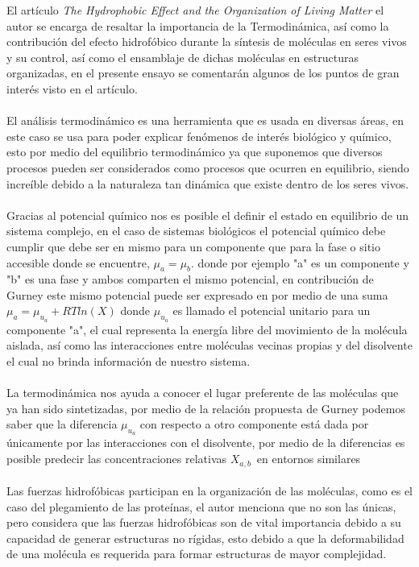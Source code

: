 \documentclass[10pt]{article}
\title{\bt{Termodinámica y el efecto hidrofóbico en la organización de los seres vivos}}
\author{Pérez Alvarado Luis Raymundo, Facultad de Química, UNAM}
\date{16 de octubre de 2020}
\newcommand{\np}[1]{\paragraph{\normalfont{#1}}}
\newcommand{\et}[1]{\emph{#1}}
\begin{document}
    \maketitle

    El artículo \et{The Hydrophobic Effect and the Organization of Living Matter} \cite{article:article} el autor se encarga de resaltar la importancia de la Termodinámica, así como la contribución del efecto hidrofóbico durante la síntesis de moléculas en seres vivos y su control, así como el ensamblaje de dichas moléculas en estructuras organizadas, en el presente ensayo\cite{web:Elsevier} se comentarán algunos de los puntos de gran interés visto en el artículo. \np{}

    El análisis termodinámico es una herramienta que es usada en diversas áreas, en este caso se usa para poder explicar fenómenos de interés biológico y químico, esto por medio del equilibrio termodinámico ya que suponemos que diversos procesos pueden ser considerados como procesos que ocurren en equilibrio, siendo increíble debido a la naturaleza tan dinámica que existe dentro de los seres vivos.\np{}

    Gracias al potencial químico nos es posible el definir el estado en equilibrio de un sistema complejo, en el caso de sistemas biológicos el potencial químico debe cumplir que debe ser en mismo para un componente que para la fase o sitio accesible donde se encuentre, $\mu_{a} = \mu_{b}$. donde por ejemplo "a" es un componente y "b" es una fase y ambos comparten el mismo potencial, en contribución de Gurney este mismo potencial puede ser expresado en por medio de una suma $\mu_{a} = \mu_{u_{a}}+RTln(X) $ donde $\mu_{u_{a}}$ es llamado el potencial unitario para un componente "a", el cual representa la energía libre del movimiento de la molécula aislada, así como las interacciones entre moléculas vecinas propias y del disolvente el cual no brinda información de nuestro sistema. \np{}

    La termodinámica nos ayuda a conocer el lugar preferente de las moléculas que ya han sido sintetizadas, por medio de la relación propuesta de Gurney podemos saber que la diferencia $\mu_{u_{a}}$ con respecto a otro componente está dada por únicamente por las interacciones con el disolvente, por medio de la diferencias es posible predecir las concentraciones relativas $X_{a,b}$\ en entornos similares \np{}
    
    Las fuerzas hidrofóbicas participan en la organización de las moléculas, como es el caso del plegamiento de las proteínas, el autor menciona que no son las únicas, pero considera que las fuerzas hidrofóbicas son de vital importancia debido a su capacidad de generar estructuras no rígidas, esto debido a que la deformabilidad de una molécula es requerida para formar estructuras de mayor complejidad.\np{}
    
\end{document}
